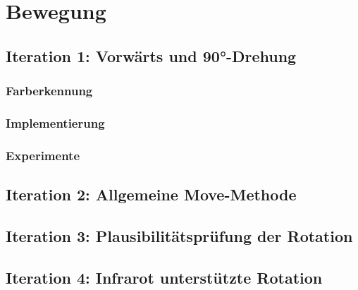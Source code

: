 
\section{Bewegung}

\subsection{Iteration 1: Vorwärts und 90°-Drehung}

\subsubsection{Farberkennung}


\subsubsection{Implementierung}


\subsubsection{Experimente}


\subsection{Iteration 2: Allgemeine Move-Methode}


\subsection{Iteration 3: Plausibilitätsprüfung der Rotation}


\subsection{Iteration 4: Infrarot unterstützte Rotation}
\label{sec:movement-ir}
